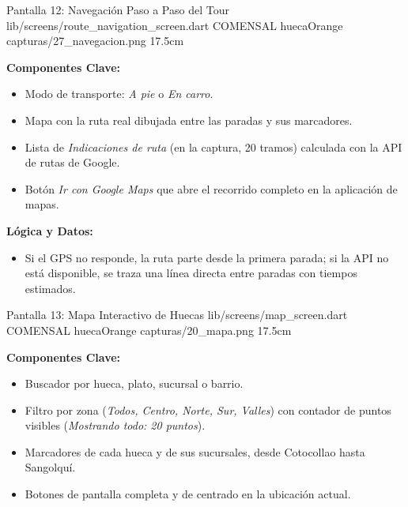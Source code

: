 \pantallashowcase
  {Pantalla 12: Navegación Paso a Paso del Tour}
  {lib/screens/route\_navigation\_screen.dart}
  {COMENSAL}
  {huecaOrange}
  {capturas/27_navegacion.png}
  {17.5cm}
  {

    \textbf{Componentes Clave:}
    \begin{itemize}[leftmargin=*, itemsep=2pt]
      \item Modo de transporte: \textit{A pie} o \textit{En carro}.
      \item Mapa con la ruta real dibujada entre las paradas y sus marcadores.
      \item Lista de \textit{Indicaciones de ruta} (en la captura, 20 tramos) calculada con la API de rutas de Google.
      \item Botón \textit{Ir con Google Maps} que abre el recorrido completo en la aplicación de mapas.
    \end{itemize}
    \vspace{0.2cm}

    \textbf{Lógica y Datos:}
    \begin{itemize}[leftmargin=*, itemsep=2pt]
      \item Si el GPS no responde, la ruta parte desde la primera parada; si la API no está disponible, se traza una línea directa entre paradas con tiempos estimados.
    \end{itemize}
  }

\pantallashowcase
  {Pantalla 13: Mapa Interactivo de Huecas}
  {lib/screens/map\_screen.dart}
  {COMENSAL}
  {huecaOrange}
  {capturas/20_mapa.png}
  {17.5cm}
  {

    \textbf{Componentes Clave:}
    \begin{itemize}[leftmargin=*, itemsep=2pt]
      \item Buscador por hueca, plato, sucursal o barrio.
      \item Filtro por zona (\textit{Todos, Centro, Norte, Sur, Valles}) con contador de puntos visibles (\textit{Mostrando todo: 20 puntos}).
      \item Marcadores de cada hueca y de sus sucursales, desde Cotocollao hasta Sangolquí.
      \item Botones de pantalla completa y de centrado en la ubicación actual.
    \end{itemize}
  }

